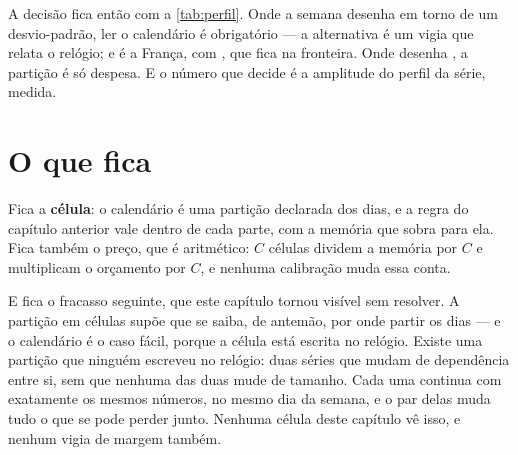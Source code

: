 A decisão fica então com a \cref{tab:perfil}. Onde a semana desenha em torno de um desvio-padrão,
ler o calendário é obrigatório --- a alternativa é um vigia que relata o relógio; e é a França, com
\numCalendarioAmplitudeFr, que fica na fronteira. Onde desenha \numCalendarioAmplitudeIndice, a partição
é só despesa. E o número que decide é a amplitude do perfil da série, medida.

\section{O que fica}

Fica a \textbf{célula}: o calendário é uma partição declarada dos dias, e a regra do capítulo
anterior vale dentro de cada parte, com a memória que sobra para ela. Fica também o preço, que é aritmético: $C$ células dividem a memória por $C$ e multiplicam o orçamento por $C$, e nenhuma calibração muda essa conta.

E fica o fracasso seguinte, que este capítulo tornou visível sem resolver. A partição em
células supõe que se saiba, de antemão, por onde partir os dias --- e o calendário é o caso
fácil, porque a célula está escrita no relógio. Existe uma partição que ninguém escreveu no relógio: duas séries que mudam de dependência entre si, sem que nenhuma das duas mude de
tamanho. Cada uma continua com exatamente os mesmos números, no mesmo dia da semana, e o
par delas muda tudo o que se pode perder junto. Nenhuma célula deste capítulo vê isso, e
nenhum vigia de margem também.

